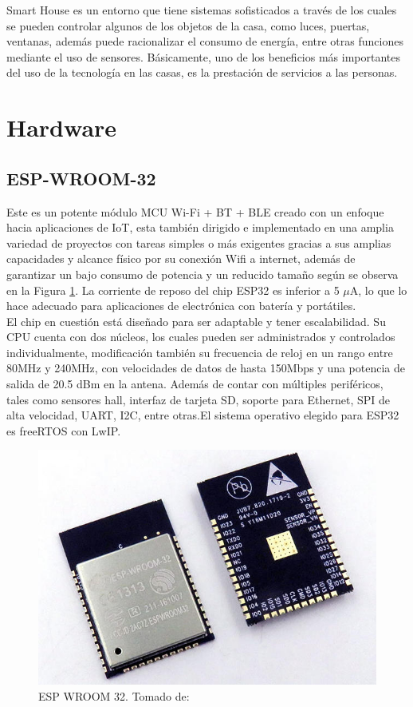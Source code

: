 Smart House es un entorno que tiene sistemas sofisticados a través de los cuales se pueden controlar algunos de los objetos de la casa, como luces, puertas, ventanas, además puede racionalizar el consumo de energía, entre otras funciones mediante el uso de sensores. Básicamente, uno de los beneficios más importantes del uso de la tecnología en las casas, es la prestación de servicios a las personas.\cite{Howedi2016} 

\section{Hardware}

\subsection{ESP-WROOM-32}

Este es un potente módulo MCU Wi-Fi + BT + BLE creado con un enfoque hacia aplicaciones de IoT, esta también dirigido e implementado en una amplia variedad de proyectos con tareas simples o más exigentes gracias a sus amplias capacidades y alcance físico por su conexión Wifi a internet, además de garantizar un bajo consumo de potencia y un reducido tamaño según se observa en la Figura \ref{fig:esp32-wroom-s32-00}. La corriente de reposo del chip ESP32 es inferior a 5 $\mu$A, lo que lo hace adecuado para aplicaciones de electrónica con batería y portátiles.\\

El chip en cuestión está diseñado para ser adaptable y tener escalabilidad. Su CPU cuenta con dos núcleos, los cuales pueden ser administrados y controlados individualmente, modificación también su frecuencia de reloj en un rango entre 80MHz y 240MHz, con velocidades de datos de hasta 150Mbps y una potencia de salida de 20.5 dBm en la antena. Además de contar con múltiples periféricos, tales como sensores hall, interfaz de tarjeta SD, soporte para Ethernet, SPI de alta velocidad, UART, I2C, entre otras.El sistema operativo elegido para ESP32 es freeRTOS con LwIP.\cite{EW32}\\


\begin{figure}[H]
	\centering
	\caption[ESP WROOM 32.]{ESP WROOM 32. Tomado de: \cite{ESPIMG}}
	\label{fig:esp32-wroom-s32-00}
	\includegraphics{Imagenes/esp32-wroom-s32-00}
\end{figure}

